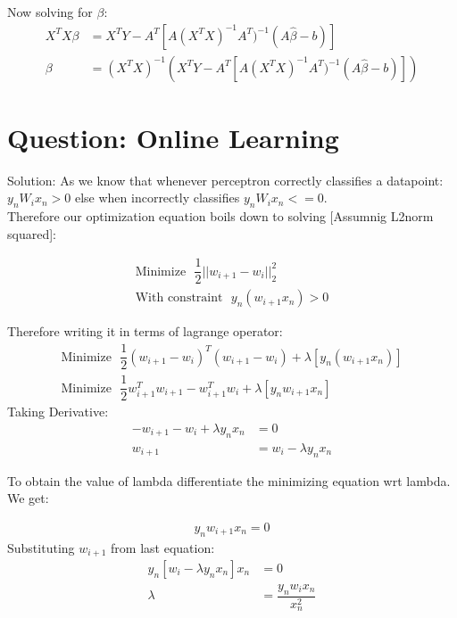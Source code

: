 \documentclass[paper=a4, fontsize=11pt]{scrartcl} %
\numberwithin{equation}{section} %
\numberwithin{figure}{section} %
\numberwithin{table}{section} %
\begin{document}
Now solving for $\beta$:
\begin{align}
X^{T}X\beta &= X^{T}Y - A^{T}[A(X^{T}X)^{-1}A^{T})^{-1}(A\hat{\beta} - b)]\\
\beta &= (X^{T}X)^{-1}(X^{T}Y - A^{T}[A(X^{T}X)^{-1}A^{T})^{-1}(A\hat{\beta} - b)])
\end{align}
\endgroup




\section{Question: Online Learning}
Solution:
As we know that whenever perceptron correctly classifies a datapoint: $y_{n}W_{i}x_{n}>0$ else when incorrectly classifies $y_{n}W_{i}x_{n}<=0$.\\
Therefore our optimization equation boils down to solving [Assumnig L2norm squared]:

\begin{align*}
\text{Minimize~~} \dfrac{1}{2}||w_{i+1}-w_{i}||^{2}_{2}\\
\text{With constraint~~} y_{n}(w_{i+1}x_{n})>0
\end{align*}

Therefore writing it in terms of lagrange operator:
\begin{align*}
\text{Minimize~~} \dfrac{1}{2}(w_{i+1}-w_{i})^{T}(w_{i+1}-w_{i}) + \lambda [y_{n}(w_{i+1}x_{n})]\\
\text{Minimize~~} \dfrac{1}{2}w_{i+1}^{T}w_{i+1} - w_{i+1}^{T}w_{i} + \lambda[y_{n}w_{i+1}x_{n}]
\end{align*}
Taking Derivative:
\begin{align*}
-w_{i+1} - w_{i} + \lambda y_{n}x_{n} &= 0\\
w_{i+1} &= w_{i} - \lambda y_{n}x_{n}
\end{align*}

To obtain the value of lambda differentiate the minimizing equation wrt lambda. We get:

\begin{align*}
y_{n}w_{i+1}x_{n} = 0
\end{align*}
Substituting $w_{i+1}$ from last equation:
\begin{align*}
y_{n}[w_{i} - \lambda y_{n}x_{n}]x_{n}&=0\\
\lambda &= \dfrac{y_{n}w_{i}x_{n}}{x_{n}^{2}}
\end{align*}
\end{document}

